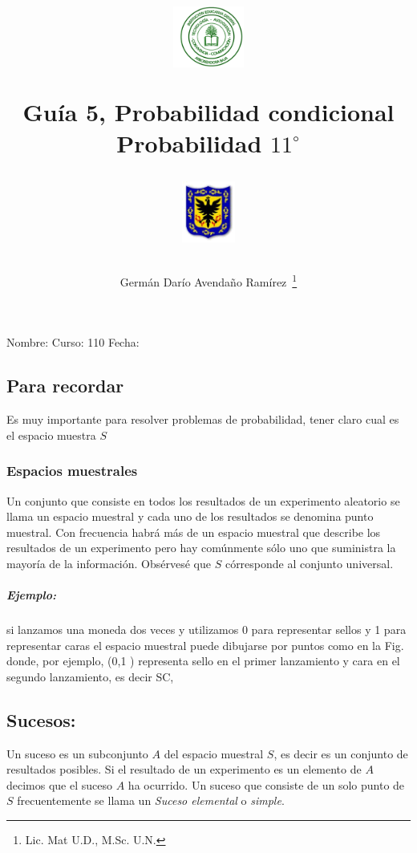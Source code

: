 \documentclass[letterpaper]{article}
\author{Germ\'an Dar\'io Avenda\~no Ram\'irez~\thanks{Lic. Mat U.D., M.Sc. U.N.}}
\title{\begin{minipage}{0.15\textwidth}\includegraphics[height=2cm]{Images/logo-colegio.png}
\end{minipage}\hfill \begin{minipage}{0.7\textwidth}\begin{center}
Guía 5, Probabilidad condicional\\
Probabilidad $11^{\circ}$\end{center}
\end{minipage}\hfill
\begin{minipage}{0.15\textwidth}
  \includegraphics[height=2cm]{Images/logo-sed.png} 
\end{minipage}}
\date{}
\begin{document}
\maketitle
Nombre: \hrulefill Curso: 110\underline{\hspace{12pt}}  Fecha: \underline{\hspace{2cm}}\\

\begin{multicols}{2}
\section*{Para recordar}
Es muy importante para resolver problemas de probabilidad, tener claro cual es el espacio muestra $S$
\subsubsection*{Espacios muestrales}
Un conjunto que consiste en todos los resultados de un experimento aleatorio se llama un espacio muestral y cada uno de los resultados se denomina punto muestral. Con frecuencia habrá más de un espacio muestral que describe los resultados de un experimento pero hay comúnmente
sólo uno que suministra la mayoría de la información. Obsérvesé que $S$ córresponde al conjunto universal.
\subparagraph*{Ejemplo:}  si lanzamos una moneda dos veces y utilizamos 0 para representar sellos y 1 para representar caras el espacio muestral puede dibujarse por puntos como en la Fig. donde, por ejemplo, (0,1 ) representa sello en el primer lanzamiento y cara en el segundo lanzamiento, es decir SC,
\begin{center}
\end{center}
\subsection*{Sucesos:}
Un suceso es un subconjunto $A$ del espacio muestral $S$, es decir es un conjunto de resultados posibles. Si el resultado de un experimento es un elemento de $A$ decimos que el suceso $A$ ha ocurrido. Un suceso que consiste de un solo punto de $S$ frecuentemente se llama un \emph{Suceso elemental} o \emph{simple}.\\


\end{multicols}
\end{document}
